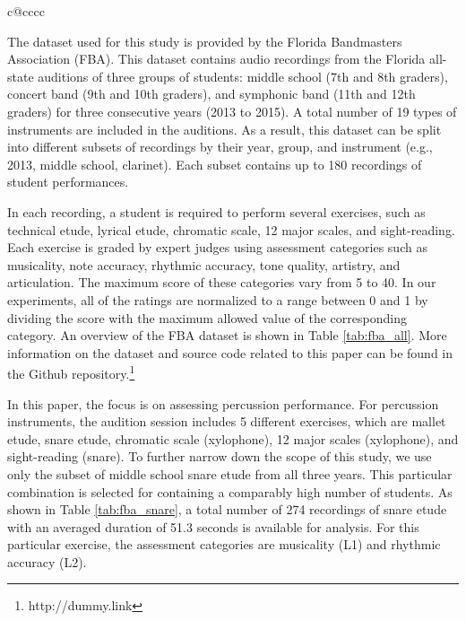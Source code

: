 \documentclass[conference]{IEEEtran}
\begin{document}
\begin{table}
\begin{tabularx}{\columnwidth}{c@{\extracolsep{\fill}}cccc}
 \\ \hline
\end{tabularx}
\label{tab:fba_all}
\end{table}


The dataset used for this study is provided by the Florida Bandmasters Association (FBA). This dataset contains audio recordings from the Florida all-state auditions of three groups of students: middle school (7th and 8th graders), concert band (9th and 10th graders), and symphonic band (11th and 12th graders) for three consecutive years (2013 to 2015). A total number of 19 types of instruments are included in the auditions. As a result, this dataset can be split into different subsets of recordings by their year, group, and instrument (e.g., 2013, middle school, clarinet). Each subset contains up to 180 recordings of student performances.  

In each recording, a student is required to perform several exercises, such as technical etude, lyrical etude, chromatic scale, 12 major scales, and sight-reading. Each exercise is graded by expert judges using assessment categories such as musicality, note accuracy, rhythmic accuracy, tone quality, artistry, and articulation. The maximum score of these categories vary from 5 to 40. In our experiments, all of the ratings are normalized to a range between 0 and 1 by dividing the score with the maximum allowed value of the corresponding category. An overview of the FBA dataset is shown in Table \ref{tab:fba_all}. More information on the dataset and source code related to this paper can be found in the Github repository.\footnote{http://dummy.link}  

In this paper, the focus is on assessing percussion performance. For percussion instruments, the audition session includes 5 different exercises, which are mallet etude, snare etude, chromatic scale (xylophone), 12 major scales (xylophone), and sight-reading (snare). To further narrow down the scope of this study, we use only the subset of middle school snare etude from all three years. This particular combination is selected for containing a comparably high number of students. As shown in Table \ref{tab:fba_snare}, a total number of 274 recordings of snare etude with an averaged duration of 51.3 seconds is available for analysis. For this particular exercise, the assessment categories are musicality (L1) and rhythmic accuracy (L2).
\end{document}
